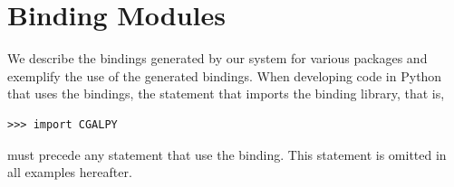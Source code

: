\section{Binding Modules}
\label{sec:modules}
We describe the bindings generated by our system for various \cgal{} packages and exemplify the use of the generated bindings.
%
When developing code in Python that uses the bindings, the statement that imports the binding library, that is,
\begin{lstlisting}[style=pythonStyle]
>>> import CGALPY
\end{lstlisting}
must precede any statement that use the binding. This statement is omitted in all examples hereafter.

